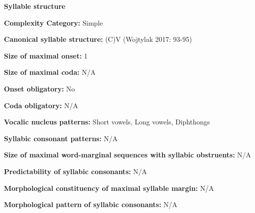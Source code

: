 \begin{styleBody}
\textbf{Syllable structure}
\end{styleBody}

\begin{styleBody}
\textbf{Complexity Category:} Simple
\end{styleBody}

\begin{styleBody}
\textbf{Canonical syllable structure:} (C)V\textbf{ }(Wojtylak 2017: 93-95)
\end{styleBody}

\begin{styleBody}
\textbf{Size of maximal onset:} 1
\end{styleBody}

\begin{styleBody}
\textbf{Size of maximal coda: }N/A
\end{styleBody}

\begin{styleBody}
\textbf{Onset obligatory:} No
\end{styleBody}

\begin{styleBody}
\textbf{Coda obligatory:} N/A
\end{styleBody}

\begin{styleBody}
\textbf{Vocalic nucleus patterns: }Short vowels, Long vowels, Diphthongs
\end{styleBody}

\begin{styleBody}
\textbf{Syllabic consonant patterns:} N/A
\end{styleBody}

\begin{styleBody}
\textbf{Size of maximal word{}-marginal sequences with syllabic obstruents:} N/A
\end{styleBody}

\begin{styleBody}
\textbf{Predictability of syllabic consonants:} N/A
\end{styleBody}

\begin{styleBody}
\textbf{Morphological constituency of maximal syllable margin:} N/A
\end{styleBody}

\begin{styleBody}
\textbf{Morphological pattern of syllabic consonants:} N/A
\end{styleBody}

